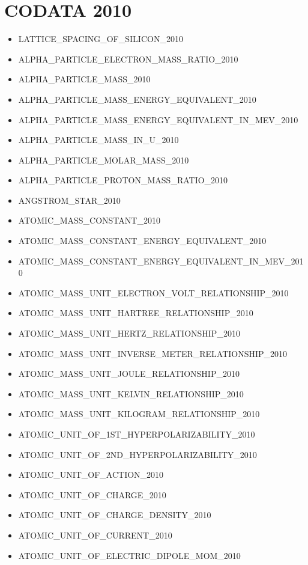 \section{CODATA 2010}

\begin{itemize}
\item
  LATTICE\_SPACING\_OF\_SILICON\_2010
\item
  ALPHA\_PARTICLE\_ELECTRON\_MASS\_RATIO\_2010
\item
  ALPHA\_PARTICLE\_MASS\_2010
\item
  ALPHA\_PARTICLE\_MASS\_ENERGY\_EQUIVALENT\_2010
\item
  ALPHA\_PARTICLE\_MASS\_ENERGY\_EQUIVALENT\_IN\_MEV\_2010
\item
  ALPHA\_PARTICLE\_MASS\_IN\_U\_2010
\item
  ALPHA\_PARTICLE\_MOLAR\_MASS\_2010
\item
  ALPHA\_PARTICLE\_PROTON\_MASS\_RATIO\_2010
\item
  ANGSTROM\_STAR\_2010
\item
  ATOMIC\_MASS\_CONSTANT\_2010
\item
  ATOMIC\_MASS\_CONSTANT\_ENERGY\_EQUIVALENT\_2010
\item
  ATOMIC\_MASS\_CONSTANT\_ENERGY\_EQUIVALENT\_IN\_MEV\_2010
\item
  ATOMIC\_MASS\_UNIT\_ELECTRON\_VOLT\_RELATIONSHIP\_2010
\item
  ATOMIC\_MASS\_UNIT\_HARTREE\_RELATIONSHIP\_2010
\item
  ATOMIC\_MASS\_UNIT\_HERTZ\_RELATIONSHIP\_2010
\item
  ATOMIC\_MASS\_UNIT\_INVERSE\_METER\_RELATIONSHIP\_2010
\item
  ATOMIC\_MASS\_UNIT\_JOULE\_RELATIONSHIP\_2010
\item
  ATOMIC\_MASS\_UNIT\_KELVIN\_RELATIONSHIP\_2010
\item
  ATOMIC\_MASS\_UNIT\_KILOGRAM\_RELATIONSHIP\_2010
\item
  ATOMIC\_UNIT\_OF\_1ST\_HYPERPOLARIZABILITY\_2010
\item
  ATOMIC\_UNIT\_OF\_2ND\_HYPERPOLARIZABILITY\_2010
\item
  ATOMIC\_UNIT\_OF\_ACTION\_2010
\item
  ATOMIC\_UNIT\_OF\_CHARGE\_2010
\item
  ATOMIC\_UNIT\_OF\_CHARGE\_DENSITY\_2010
\item
  ATOMIC\_UNIT\_OF\_CURRENT\_2010
\item
  ATOMIC\_UNIT\_OF\_ELECTRIC\_DIPOLE\_MOM\_2010

\end{itemize}
